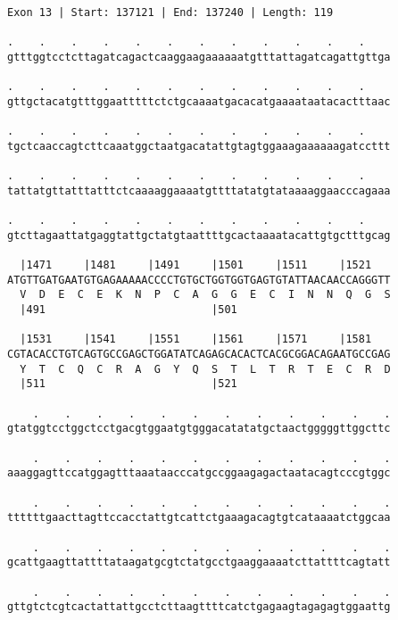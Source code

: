 \documentclass{article}
\begin{document}
\begin{Verbatim}[fontfamily=courier]
Exon 13 | Start: 137121 | End: 137240 | Length: 119

.    .    .    .    .    .    .    .    .    .    .    .    
gtttggtcctcttagatcagactcaaggaagaaaaaatgtttattagatcagattgttga

.    .    .    .    .    .    .    .    .    .    .    .    
gttgctacatgtttggaatttttctctgcaaaatgacacatgaaaataatacactttaac

.    .    .    .    .    .    .    .    .    .    .    .    
tgctcaaccagtcttcaaatggctaatgacatattgtagtggaaagaaaaaagatccttt

.    .    .    .    .    .    .    .    .    .    .    .    
tattatgttatttatttctcaaaaggaaaatgttttatatgtataaaaggaacccagaaa

.    .    .    .    .    .    .    .    .    .    .    .    
gtcttagaattatgaggtattgctatgtaattttgcactaaaatacattgtgctttgcag

  |1471     |1481     |1491     |1501     |1511     |1521   
ATGTTGATGAATGTGAGAAAAACCCCTGTGCTGGTGGTGAGTGTATTAACAACCAGGGTT
  V  D  E  C  E  K  N  P  C  A  G  G  E  C  I  N  N  Q  G  S
  |491                          |501                        

  |1531     |1541     |1551     |1561     |1571     |1581   
CGTACACCTGTCAGTGCCGAGCTGGATATCAGAGCACACTCACGCGGACAGAATGCCGAG
  Y  T  C  Q  C  R  A  G  Y  Q  S  T  L  T  R  T  E  C  R  D
  |511                          |521                        

    .    .    .    .    .    .    .    .    .    .    .    .
gtatggtcctggctcctgacgtggaatgtgggacatatatgctaactgggggttggcttc

    .    .    .    .    .    .    .    .    .    .    .    .
aaaggagttccatggagtttaaataacccatgccggaagagactaatacagtcccgtggc

    .    .    .    .    .    .    .    .    .    .    .    .
ttttttgaacttagttccacctattgtcattctgaaagacagtgtcataaaatctggcaa

    .    .    .    .    .    .    .    .    .    .    .    .
gcattgaagttattttataagatgcgtctatgcctgaaggaaaatcttattttcagtatt

    .    .    .    .    .    .    .    .    .    .    .    .
gttgtctcgtcactattattgcctcttaagttttcatctgagaagtagagagtggaattg
\end{Verbatim}
\newpage
\end{document}
